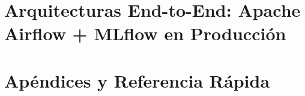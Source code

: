 \documentclass[10pt,a4paper,oneside]{book}
\begin{document}
\part{Arquitecturas End-to-End: Apache Airflow + MLflow en Producción}


\appendix
\part{Apéndices y Referencia Rápida}



\end{document}
